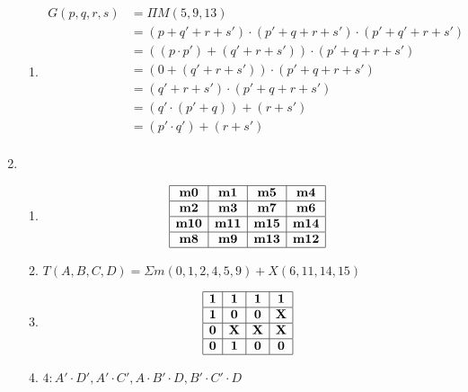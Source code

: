 \documentclass[12pt, a4paper]{article}
\begin{document}
\begin{enumerate}[Q\arabic*.]
\begin{enumerate}[(\alph*.)]
      \item 
        \begin{align*}
          G(p,q,r,s) &= \Pi M(5,9,13)\\
                     &= (p+q'+r+s')\cdot(p'+q+r+s')\cdot(p'+q'+r+s')\tag*{(Defn of maxterm)}\\
                     &= ((p\cdot p') + (q' + r + s'))\cdot (p'+q+r+s')\tag*{(Distributive law)}\\
                     &= (0 + (q' + r + s'))\cdot (p'+q+r+s')\tag*{(Complement law)}\\
                     &= (q' + r + s')\cdot (p'+q+r+s')\tag*{(Identity law)}\\
                     &= (q' \cdot (p' + q)) + (r+s')\tag*{(Distributive law)}\\
                     &= (p'\cdot q') + (r+s')\tag*{(Absorption 2)}\\
        \end{align*}
    \end{enumerate}

    \pagebreak
  \item 
    \begin{enumerate}[(\alph*.)]
      \item \[
        \begin{array}{|c|c|c|c|}
            \hline
            \textbf{m0} & \textbf{m1}& \textbf{m5}& \textbf{m4}\\ \hline
            \textbf{m2} & \textbf{m3}& \textbf{m7}& \textbf{m6}\\ \hline
            \textbf{m10} & \textbf{m11}& \textbf{m15}& \textbf{m14}\\ \hline
            \textbf{m8} & \textbf{m9}& \textbf{m13}& \textbf{m12}\\ \hline
        \end{array}
        \]
      \item $T(A,B,C,D) = \Sigma m(0,1,2,4,5,9) + X(6,11,14,15)$

      \item \[
        \begin{array}{|c|c|c|c|}
            \hline
            \textbf{1} & \textbf{1}& \textbf{1}& \textbf{1}\\ \hline
            \textbf{1} & \textbf{0}& \textbf{0}& \textbf{X}\\ \hline
            \textbf{0} & \textbf{X}& \textbf{X}& \textbf{X}\\ \hline
            \textbf{0} & \textbf{1}& \textbf{0}& \textbf{0}\\ \hline
          \end{array}\]
      \item $4: A'\cdot D', A'\cdot C', A\cdot B'\cdot D, B'\cdot C'\cdot D$


\end{enumerate}
\end{enumerate}
\end{document}
